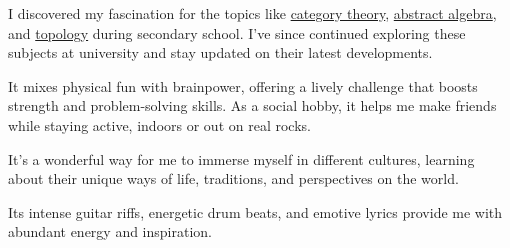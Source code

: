 
\begin{cvhonors}

	{I discovered my fascination for the topics like \href{https://en.wikipedia.org/wiki/Category_theory}{category theory}, \href{https://en.wikipedia.org/wiki/Abstract_algebra}{abstract algebra}, and \href{https://en.wikipedia.org/wiki/Topology}{topology} during secondary school. I've since continued exploring these subjects at university and stay updated on their latest developments.}
	{}
	{}

	{It mixes physical fun with brainpower, offering a lively challenge that boosts strength and problem-solving skills. As a social hobby, it helps me make friends while staying active, indoors or out on real rocks.}
	{}
	{}

	{It's a wonderful way for me to immerse myself in different cultures, learning about their unique ways of life, traditions, and perspectives on the world.}
	{}
	{}

	{Its intense guitar riffs, energetic drum beats, and emotive lyrics provide me with abundant energy and inspiration.}
	{}
	{}

\end{cvhonors}
